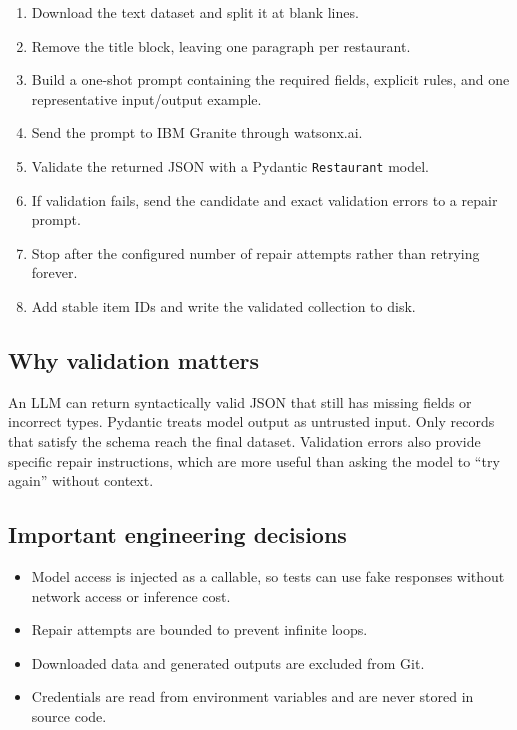 \documentclass[11pt]{article}
\begin{document}
\begin{enumerate}
  \item Download the text dataset and split it at blank lines.
  \item Remove the title block, leaving one paragraph per restaurant.
  \item Build a one-shot prompt containing the required fields, explicit rules,
        and one representative input/output example.
  \item Send the prompt to IBM Granite through watsonx.ai.
  \item Validate the returned JSON with a Pydantic \texttt{Restaurant} model.
  \item If validation fails, send the candidate and exact validation errors to
        a repair prompt.
  \item Stop after the configured number of repair attempts rather than
        retrying forever.
  \item Add stable item IDs and write the validated collection to disk.
\end{enumerate}

\subsection{Why validation matters}

An LLM can return syntactically valid JSON that still has missing fields or
incorrect types. Pydantic treats model output as untrusted input. Only records
that satisfy the schema reach the final dataset. Validation errors also provide
specific repair instructions, which are more useful than asking the model to
``try again'' without context.

\subsection{Important engineering decisions}

\begin{itemize}
  \item Model access is injected as a callable, so tests can use fake responses
        without network access or inference cost.
  \item Repair attempts are bounded to prevent infinite loops.
  \item Downloaded data and generated outputs are excluded from Git.
  \item Credentials are read from environment variables and are never stored
        in source code.
\end{itemize}
\end{document}
